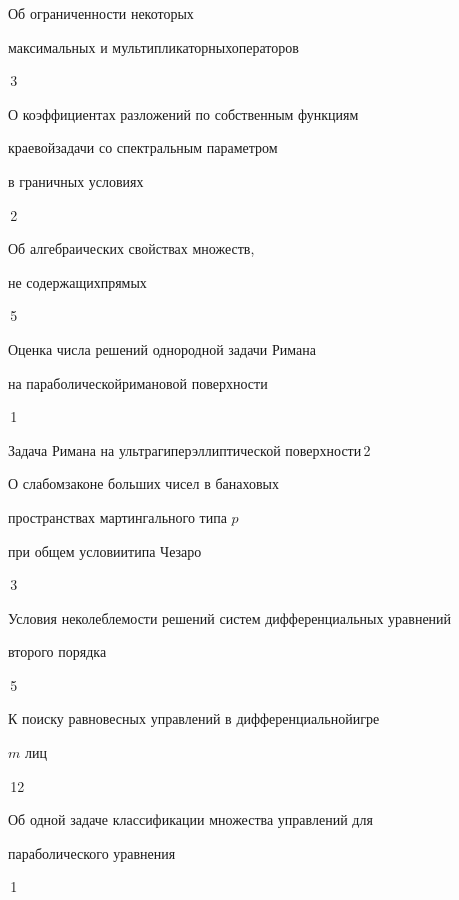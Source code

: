 

{Об ограниченности некоторых


максимальных и мультипликаторных\newline операторов}{\No\,3}




{О коэффициентах разложений по собственным функциям  


краевой\newline задачи со спектральным параметром  


в граничных условиях}{\No\,2}




{Об алгебраических свойствах множеств,


не содержащих\newline прямых}{\No\,5}




{Оценка числа решений однородной задачи Римана


на параболической\newline римановой поверхности}{\No\,1}




{Задача Римана на ультрагиперэллиптической поверхности}{\No\,2}




{О слабом\newline законе больших чисел в банаховых


пространствах мартингального типа $p$ 


при общем условии\newline типа Чезаро}{\No\,3}




{Условия неколеблемости решений систем дифференциальных уравнений 


\newline второго порядка}{\No\,5}




{К поиску равновесных управлений в дифференциальной\newline игре


$m$ лиц}{\No\,12}




{Об одной задаче классификации множества управлений для\newline


параболического уравнения}{\No\,1}



